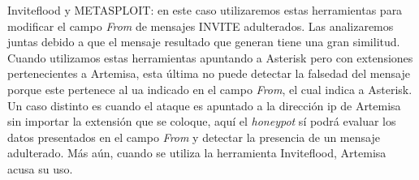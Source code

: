 \documentclass[a4paper,12pt]{report}
\begin{document}
Inviteflood y METASPLOIT: en este caso utilizaremos estas herramientas para modificar el 
campo \emph{From} de mensajes INVITE adulterados. Las analizaremos juntas debido a que el mensaje
resultado que generan  tiene una gran similitud. 
Cuando utilizamos estas herramientas apuntando a Asterisk pero con extensiones 
pertenecientes a Artemisa, esta última no puede detectar la falsedad del mensaje
porque este pertenece al \ac{ua} indicado en el campo \emph{From}, el
cual indica a Asterisk.
Un caso distinto es cuando el ataque es apuntado a la dirección \ac{ip} de Artemisa
sin importar la extensión que se coloque,  aquí el \emph{honeypot} sí podrá evaluar
los datos presentados en el campo \emph{From} y detectar la presencia de un mensaje
adulterado. Más aún, cuando se utiliza la herramienta Inviteflood, Artemisa
acusa su uso.
\end{document}
